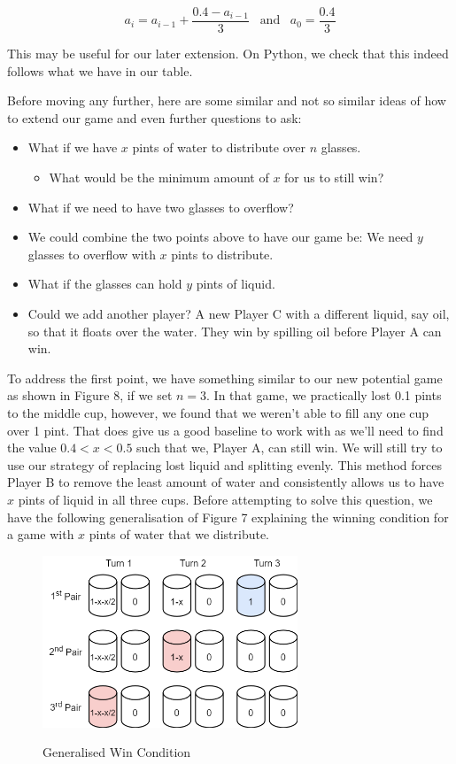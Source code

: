 \documentclass[11pt]{article}
\newcommand{\keywordfont}{\textsc}
\newcommand{\keyword}[1]{%
  \marginpar{\raggedright\small\keywordfont{#1}}}
\begin{document}
\[
a_i = a_{i-1} + \frac{0.4 - a_{i-1}}{3} \hspace{10pt} \text{and} \hspace{10pt} a_0 = \frac{0.4}{3}
\]

This may be useful for our later extension. On \keyword{Check} Python, we check that this indeed follows what we have in our table.

Before moving any further, here are some similar and not so similar ideas of how to \keyword{Extend} extend our game and even further questions to ask:
\begin{itemize}
    \item What if we have $x$ pints of water to distribute over $n$ glasses.
    \begin{itemize}
        \item What would be the minimum amount of $x$ for us to still win?
    \end{itemize}
    \item What if we need to have two glasses to overflow? 
    \item We could combine the two points above to have our game be:  We need $y$ glasses to overflow with $x$ pints to distribute.
    \item What if the glasses can hold $y$ pints of liquid.
    \item Could we add another player? A  new Player C with a different liquid, say oil, so that it floats over the water. They win by spilling oil before Player A can win.
\end{itemize}

To \keyword{Extend} address the first point, we have something similar to our new potential game as shown in Figure 8, if we set $n=3$. In that game, we practically lost 0.1 pints to the middle cup, however, we found that we weren't able to fill any one cup over 1 pint. That does give us a good baseline to work with as we'll need to find the value $0.4 < x < 0.5$ such that we, Player A, can still win. We \keyword{Try} will still try to use our strategy of replacing lost liquid and splitting evenly. This method forces Player B to remove the least amount of water and consistently allows us to have $x$ pints of liquid in all three cups. Before attempting to solve this question, we have the following generalisation of Figure 7 explaining the winning condition for a game with $x$ pints of water that we distribute.

\begin{figure}[h]
   \centering
   \includegraphics[width=3in]{WinCon.png}
   \label{myfig}
   \caption{Generalised Win Condition}
\end{figure}
\end{document}
